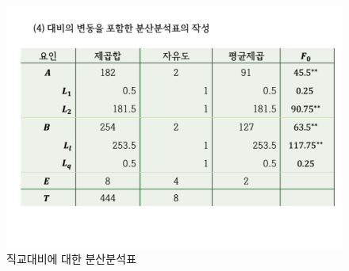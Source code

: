 \documentclass[
]{book}
\begin{document}
\begin{figure}
\centering
\includegraphics{slide04.png}
\caption{직교대비에 대한 분산분석표}
\end{figure}

  
\end{document}
